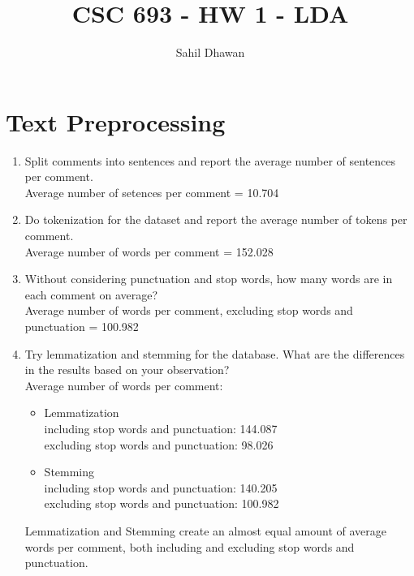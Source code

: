 \documentclass[conference]{IEEEtran}
\begin{document}
\onecolumn
\title{CSC 693 - HW 1 - LDA}
\author{Sahil Dhawan}
\maketitle
\section{Text Preprocessing}
\begin{enumerate}
    \item Split comments into sentences and report the average number of sentences per comment.\\
    \hspace{1cm}Average number of setences per comment = 10.704\\
    \item Do tokenization for the dataset and report the average number of tokens per comment.\\
    \hspace{1cm}Average number of words per comment = 152.028\\
    \item Without considering punctuation and stop words, how many words are in each comment on average?\\
    \hspace{1cm}Average number of words per comment, excluding stop words and punctuation = 100.982\\
    \item Try lemmatization and stemming for the database. What are the differences in the results based on your observation?\\
    \hspace{1cm}Average number of words per comment:
    \begin{itemize}
        \item Lemmatization\\
        \hspace{1cm}including stop words and punctuation: 144.087\\
        \hspace{1cm}excluding stop words and punctuation: 98.026
        \item Stemming\\
        \hspace{1cm}including stop words and punctuation: 140.205\\
        \hspace{1cm}excluding stop words and punctuation: 100.982
    \end{itemize}
    Lemmatization and Stemming create an almost equal amount of average words per comment, both including and excluding stop words and punctuation.
\end{enumerate}
\newpage
\end{document}
